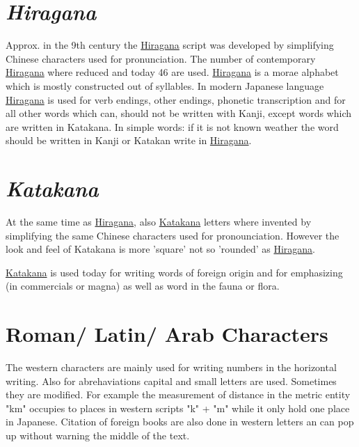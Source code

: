 \section*{\textit{Hiragana}}

Approx. in the 9th century the \hyperref[sec:Hiragana]{Hiragana} script was
developed by simplifying Chinese characters used for pronunciation. The number
of contemporary \hyperref[sec:Hiragana]{Hiragana} where reduced and today 46
are used.  \hyperref[sec:Hiragana]{Hiragana} is a morae alphabet which is
mostly constructed out of syllables. In modern Japanese language
\hyperref[sec:Hiragana]{Hiragana} is used for  verb endings, other endings,
phonetic transcription and for all other words which can, should not be written
with Kanji, except words which are written in Katakana. In simple words: if it
is not known weather the word should be written in Kanji or Katakan write in
\hyperref[sec:Hiragana]{Hiragana}.

\section*{\textit{Katakana}}

At the same time as \hyperref[sec:Hiragana]{Hiragana}, also
\hyperref[sec:Katakana]{Katakana} letters where invented by simplifying the
same Chinese characters used for pronounciation.  However the look and feel of
Katakana is more 'square' not so 'rounded' as
\hyperref[sec:Hiragana]{Hiragana}.

\hyperref[sec:Katakana]{Katakana} is used today for writing words of foreign
origin and for emphasizing (in commercials or magna) as well as word in the
fauna or flora. 

\section*{Roman/ Latin/ Arab Characters}

The western characters are mainly used for writing numbers in the horizontal
writing. Also for abrehaviations capital and small letters are used. Sometimes
they are modified. For example the measurement of distance in the metric entity
"km" occupies to places in western scripts "k" + "m" while it only hold one
place in Japanese. Citation of foreign books are also done in western letters
an can pop up without warning the middle of the text.
